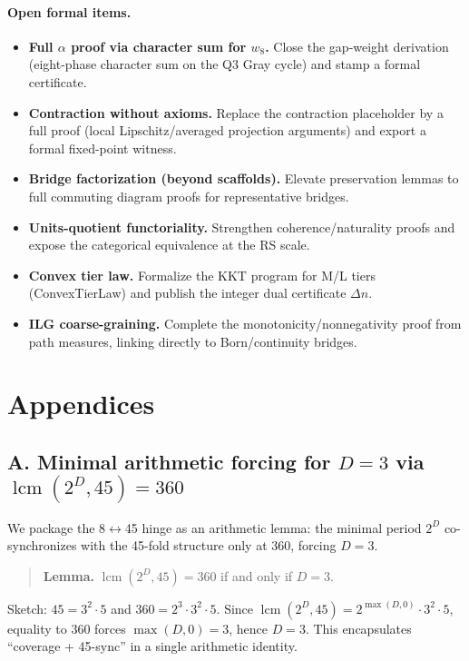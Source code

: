 \documentclass[11pt]{article}
\begin{document}
\paragraph{Open formal items.}
\begin{itemize}
  \item \textbf{Full \(\alpha\) proof via character sum for \(w_8\).} Close the gap\mbox{-}weight derivation (eight\mbox{-}phase character sum on the Q3 Gray cycle) and stamp a formal certificate.
  \item \textbf{Contraction without axioms.} Replace the contraction placeholder by a full proof (local Lipschitz/averaged projection arguments) and export a formal fixed\mbox{-}point witness.
  \item \textbf{Bridge factorization (beyond scaffolds).} Elevate preservation lemmas to full commuting diagram proofs for representative bridges.
  \item \textbf{Units\mbox{-}quotient functoriality.} Strengthen coherence/naturality proofs and expose the categorical equivalence at the RS scale.
  \item \textbf{Convex tier law.} Formalize the KKT program for M/L tiers (ConvexTierLaw) and publish the integer dual certificate \(\Delta n\).
  \item \textbf{ILG coarse\mbox{-}graining.} Complete the monotonicity/nonnegativity proof from path measures, linking directly to Born/continuity bridges.
\end{itemize}

\appendix

\section*{Appendices}

\subsection*{A. Minimal arithmetic forcing for \(D=3\) via \(\operatorname{lcm}(2^D,45)=360\)}
We package the 8\(\leftrightarrow\)45 hinge as an arithmetic lemma: the minimal period \(2^D\) co\mbox{-}synchronizes with the 45\mbox{-}fold structure only at 360, forcing \(D=3\).
\begin{quote}
\textbf{Lemma.} \(\operatorname{lcm}(2^D,45)=360\) if and only if \(D=3\).
\end{quote}
Sketch: \(45=3^2\cdot 5\) and \(360=2^3\cdot 3^2\cdot 5\). Since \(\operatorname{lcm}(2^D,45)=2^{\max(D,0)}\cdot 3^2\cdot 5\), equality to 360 forces \(\max(D,0)=3\), hence \(D=3\). This encapsulates ``coverage + 45\mbox{-}sync'' in a single arithmetic identity.
\end{document}

